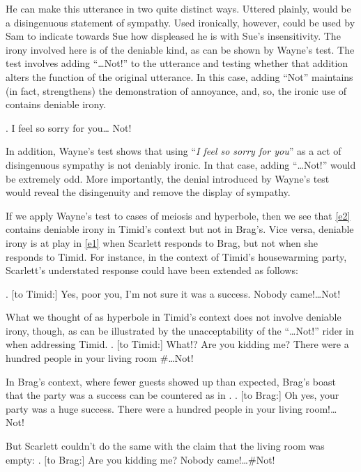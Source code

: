\documentclass[a4paper,12pt,twoside]{article}
\begin{document}
He can make this utterance in two quite distinct ways. Uttered plainly, \Last would be a disingenuous statement of sympathy. Used ironically, however, \Last could be used by Sam to indicate towards Sue how displeased he is with Sue's insensitivity. The irony involved here is of the deniable kind, as can be shown by Wayne's test. The test involves adding ``\ldots{}Not!'' to the utterance and testing whether that addition alters the function of the original utterance. In this case, adding ``Not'' maintains (in fact, strengthens) the demonstration of annoyance, and, so, the ironic use of \Last contains deniable irony. 

\ex. I feel so sorry for you\ldots{} Not!

In addition, Wayne's test shows that using ``{\em I feel so sorry for you}'' as a act of disingenuous sympathy is not deniably ironic. In that case, adding ``\ldots Not!'' would be extremely odd. More importantly, the denial introduced by Wayne's test would reveal the disingenuity and remove the display of sympathy.

If we apply Wayne's test to cases of meiosis and hyperbole, then we see that \ref{e2} contains deniable irony in Timid's context but not in Brag's. Vice versa, deniable irony is at play in \ref{e1} when Scarlett responds to Brag, but not when she responds to Timid. For instance, in the context of Timid's housewarming party, Scarlett's understated response could have been extended as follows:

\ex. $[$to Timid:] Yes, poor you, I'm not sure it was a success. Nobody came!\ldots Not!

What we thought of as hyperbole in Timid's context does not involve deniable irony, though, as can be illustrated by the unacceptability of the ``\ldots Not!'' rider in \Next when addressing Timid.
\ex. $[$to Timid:] What!? Are you kidding me? There were a hundred people in your living room \#\ldots Not!\label{u1}

In Brag's context, where fewer guests showed up than expected, Brag's boast that the party was a success can be countered as in \Next.
\ex. $[$to Brag:] Oh yes, your party was a huge success. There were a hundred people in your living room!\ldots{} Not!

But Scarlett couldn't do the same with the claim that the living room was empty:
\ex. $[$to Brag:] Are you kidding me? Nobody came!\ldots{}\#Not!\label{u2}
\end{document}
